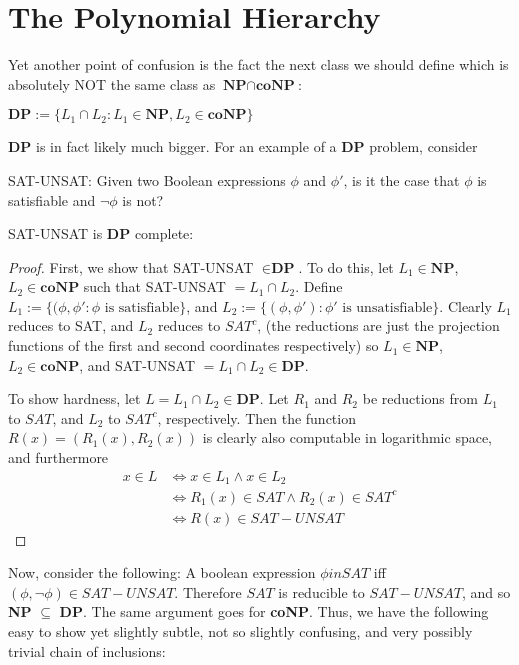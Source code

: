 \section{The Polynomial Hierarchy}
\par Yet another point of confusion is the fact the next class we should define which is absolutely NOT the same class as $\textbf{NP} \cap \textbf{coNP}$:
\begin{definition}
    $\textbf{DP} := \{L_1 \cap L_2: L_1 \in \textbf{NP}, L_2 \in \textbf{coNP}\}$
\end{definition}
\textbf{DP} is in fact likely much bigger. For an example of a \textbf{DP} problem, consider
\begin{problem}
    SAT-UNSAT: Given two Boolean expressions $\phi$ and $\phi'$, is it the case that $\phi$ is satisfiable and $\neg\phi$ is not?
\end{problem}
\begin{theorem}
    SAT-UNSAT is \textbf{DP} complete:
\end{theorem}
\begin{proof}
    First, we show that SAT-UNSAT $\in \textbf{DP}$. To do this, let $L_1 \in \textbf{NP}$, $L_2 \in \textbf{coNP}$ such that SAT-UNSAT $= L_1 \cap L_2$. Define $L_1 := \{(\phi,\phi': \phi \textrm{ is satisfiable} \}$, and $L_2 := \{(\phi,\phi'): \phi' \textrm{ is unsatisfiable} \}$. Clearly $L_1$ reduces to SAT, and $L_2$ reduces to $SAT^c$, (the reductions are just the projection functions of the first and second coordinates respectively) so $L_1 \in \textbf{NP}$, $L_2 \in \textbf{coNP}$, and SAT-UNSAT $= L_1 \cap L_2 \in \textbf{DP}$. 
    \par To show hardness, let $L = L_1 \cap L_2 \in \textbf{DP}$. Let $R_1$ and $R_2$ be reductions from $L_1$ to $SAT$, and $L_2$ to $SAT^c$, respectively. Then the function $R(x) = (R_1(x),R_2(x))$ is clearly also computable in logarithmic space, and furthermore 
    \begin{align}
        x \in L &\iff x \in L_1 \wedge x \in L_2 \\
                &\iff R_1(x) \in SAT \wedge R_2(x) \in SAT^c \\
                &\iff R(x) \in SAT-UNSAT
    \end{align}
\end{proof}
Now, consider the following: A boolean expression $\phi in SAT$ iff $(\phi,\neg \phi) \in SAT-UNSAT$. Therefore $SAT$ is reducible to $SAT-UNSAT$, and so \textbf{NP} $\subseteq$ \textbf{DP}. The same argument goes for \textbf{coNP}. Thus, we have the following easy to show yet slightly subtle, not so slightly confusing, and very possibly trivial chain of inclusions:
